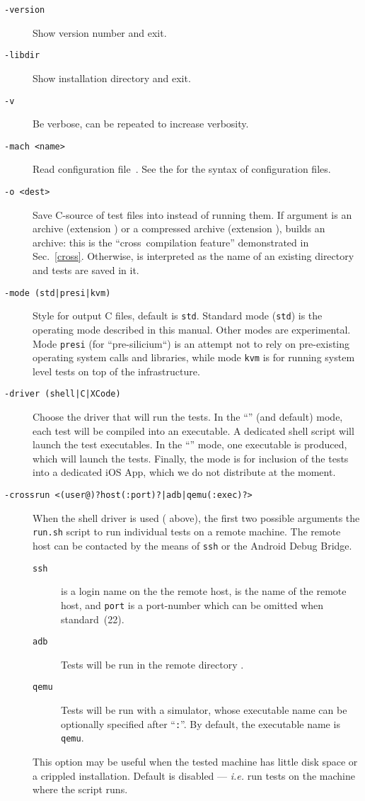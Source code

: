 \begin{description}
\item[{\tt -version}] Show version number and exit.
\item[{\tt -libdir}] Show installation directory and exit.
\item[{\tt -v}] Be verbose, can be repeated to increase verbosity.
\item[{\tt -mach <name>}] Read configuration file~.
See the 
for the syntax of configuration files.
\item[{\tt -o <dest>}]
Save C-source of test files into  instead of running them.
If  argument  is an archive (extension )
or a compressed archive (extension ),
\litmus{} builds an archive: this is the ``cross~compilation feature''
demonstrated in Sec.~\ref{cross}.
Otherwise,  is interpreted as the name of an
existing directory and tests are saved in it.
\item[{\tt -mode (std|presi|kvm)}]
Style for output C files, default is \texttt{std}.
Standard mode (\texttt{std}) is the operating mode described in this manual.
Other modes are experimental. Mode \texttt{presi} (for ``pre-silicium``) is an attempt not to rely on pre-existing operating system calls and libraries, while mode \texttt{kvm} is for running system level tests on top of the
infrastructure.
\item[{\tt -driver (shell|C|XCode)}]
Choose the driver that will run the tests.
In the ``'' (and default) mode,
each test will be compiled into an executable. A dedicated shell script
 will launch the test executables.
In the ``'' mode, one executable  is produced, which
will launch the tests.
Finally, the  mode is for inclusion of the tests into
a dedicated iOS App, which we do not distribute at the moment.
\item[{\tt -crossrun <(user@)?host(:port)?|adb|qemu(:exec)?>}]
When the shell driver is used ( above),
the first two possible arguments 
the \texttt{run.sh} script to run individual tests on a remote machine.
The remote host can be contacted by the means of \texttt{ssh}
or the Android Debug Bridge.
\begin{description}
\item[\tt ssh]
 is a login name on the the remote host,
 is the name of the remote host,
and \texttt{port} is a port-number which can be omitted when standard~(22).
\item[\tt adb]
Tests will be run in the remote directory .
\item[\tt qemu] Tests will be run with a simulator, whose executable name
can be optionally specified after ``\texttt{:}''.
By default, the executable name is \texttt{qemu}.
\end{description}
This option may be useful when the tested machine has little disk space or a
crippled installation.
Default is disabled --- \emph{i.e.} run tests on
the machine where the  script runs.


\end{description}
